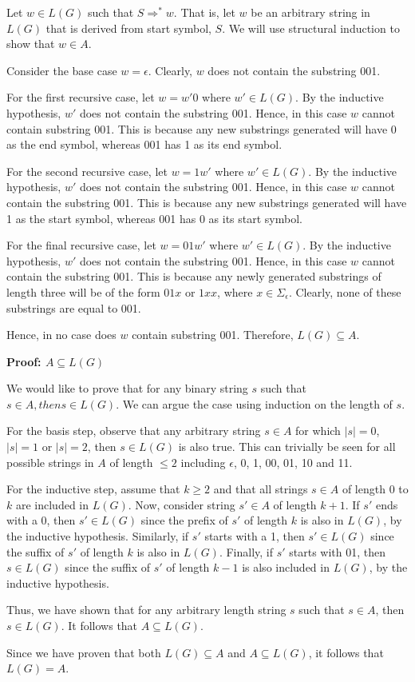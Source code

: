 \documentclass[12pt]{article}
\newcommand{\impl}{\mathbin{\Rightarrow}}
\begin{document}
\bigskip
\noindent
Let $w \in L(G)$ such that $S \impl^* w$. That is, let $w$ be an arbitrary string in $L(G)$ that is derived from 
start symbol, $S$. We will use structural induction to show that $w \in A$.

\bigskip
\noindent
Consider the base case $w = \epsilon$. Clearly, $w$ does not contain the substring 001.

\bigskip
\noindent
For the first recursive case, let $w=w'0$ where $w' \in L(G)$. By the inductive hypothesis, $w'$ does not contain
the substring 001. Hence, in this case $w$ cannot contain substring 001. This is because any new substrings generated 
will have 0 as the end symbol, whereas 001 has 1 as its end symbol.

\bigskip
\noindent
For the second recursive case, let $w=1w'$ where $w' \in L(G)$. By the inductive hypothesis, $w'$ does not contain
the substring 001. Hence, in this case $w$ cannot contain the substring 001. This is because any new substrings generated 
will have 1 as the start symbol, whereas 001 has 0 as its start symbol.

\bigskip
\noindent
For the final recursive case, let $w=01w'$ where $w' \in L(G)$. By the inductive hypothesis, $w'$ does not contain the
substring 001. Hence, in this case $w$ cannot contain the substring 001. This is because any newly generated substrings
of length three will be of the form $01x$ or $1xx$, where $x \in \Sigma_\epsilon$. Clearly, none of these substrings are equal to 001.

\bigskip
\noindent
Hence, in no case does $w$ contain substring 001. Therefore, $L(G) \subseteq A$.

\bigskip
\bigskip
\noindent
\textbf{Proof: $A \subseteq L(G)$}

\bigskip
\noindent
We would like to prove that for any binary string $s$ such that $s \in A, then s \in L(G)$. We can argue
the case using induction on the length of $s$.

\bigskip
\noindent
For the basis step, observe that any arbitrary string $s \in A$ for which $|s|=0$, $|s|=1$ or $|s|=2$, then $s \in L(G)$
is also true. This can trivially be seen for all possible strings in $A$ of length $\leq 2$ including $\epsilon$, 0, 1, 00, 01, 10 and 11.

\bigskip
\noindent
For the inductive step, assume that $k \geq 2$ and that all strings $s \in A$ of length $0$ to $k$ are included in $L(G)$.
Now, consider string $s' \in A$ of length $k+1$. If $s'$ ends with a 0, then $s' \in L(G)$ since the prefix of $s'$ of length $k$
is also in $L(G)$, by the inductive hypothesis. Similarly, if $s'$ starts with a 1, then $s' \in L(G)$ since the suffix of $s'$ of length
$k$ is also in $L(G)$. Finally, if $s'$ starts with 01, then $s \in L(G)$ since the suffix of $s'$ of length $k-1$ is also included in
$L(G)$, by the inductive hypothesis.

\bigskip
\noindent
Thus, we have shown that for any arbitrary length string $s$ such that $s \in A$, then $s \in L(G)$. It follows that $A \subseteq L(G)$.


\bigskip
\bigskip
\noindent
Since we have proven that both $L(G) \subseteq A$ and $A \subseteq L(G)$, it
follows that $L(G) = A$.
\end{document}
